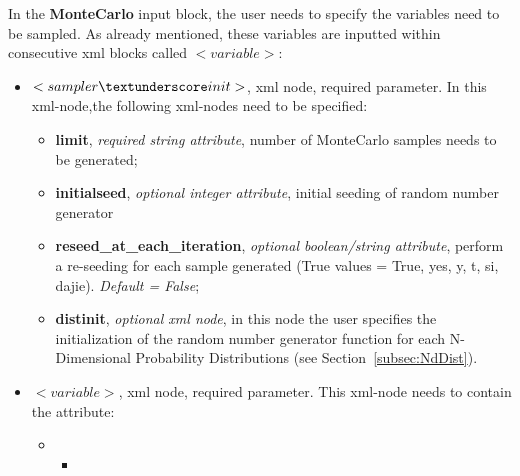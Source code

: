 In the \textbf{MonteCarlo} input block, the user needs to specify the variables need to be sampled. As already mentioned, these variables are inputted within consecutive xml blocks called $<variable>$:
\begin{itemize}
\item $<sampler\textunderscore init>$, xml node, required parameter. In this xml-node,the following xml-nodes need to be specified:
  \begin{itemize}
    \item \textbf{limit}, \textit{required string attribute}, number of MonteCarlo samples needs to be generated; 
    \item \textbf{initial\textunderscore seed}, \textit{optional integer attribute}, initial seeding of random number generator
    \item \textbf{reseed_at_each_iteration}, \textit{optional boolean/string attribute}, perform a re-seeding for each sample generated (True values = True, yes, y, t, si, dajie). \textit{Default = False}; 
    \item \textbf{dist\textunderscore init}, \textit{optional xml node}, in this node the user specifies the initialization of the random number generator function for each N-Dimensional Probability Distributions (see Section~\ref{subsec:NdDist}). 
  \end{itemize}
\item $<variable>$, xml node, required parameter. This xml-node needs to contain the attribute:
\begin{itemize}
\item \variableDescription
 \variableChildIntro
 \begin{itemize}
    \item \distributionDescription
  \end{itemize}
\end{itemize}
\end{itemize}

